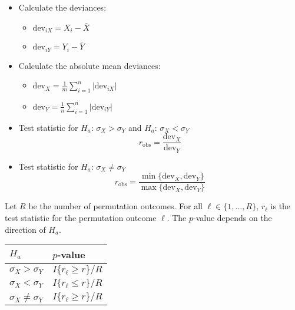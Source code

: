 \documentclass[
]{book}
\providecommand{\tightlist}{%
  \setlength{\itemsep}{0pt}\setlength{\parskip}{0pt}}
\begin{document}
\begin{itemize}
\tightlist
\item
  Calculate the deviances:

  \begin{itemize}
  \tightlist
  \item
    \(\mathrm{dev}_{iX} = X_i - \bar{X}\)
  \item
    \(\mathrm{dev}_{iY} = Y_i - \bar{Y}\)
  \end{itemize}
\item
  Calculate the absolute mean deviances:

  \begin{itemize}
  \tightlist
  \item
    \(\mathrm{dev}_X = \frac{1}{m} \sum_{i=1}^n |\mathrm{dev}_{iX}|\)
  \item
    \(\mathrm{dev}_Y = \frac{1}{n} \sum_{i=1}^n |\mathrm{dev}_{iY}|\)
  \end{itemize}
\item
  Test statistic for \(H_a\): \(\sigma_X > \sigma_Y\)
  and \(H_a\): \(\sigma_X < \sigma_Y\)
  \[r_{\mathrm{obs}} = \frac{\mathrm{dev}_X}{\mathrm{dev}_Y}\]
\item
  Test statistic for \(H_a\): \(\sigma_X \neq \sigma_Y\)
  \[r_{\mathrm{obs}} = \frac{\min \{\mathrm{dev}_X, \mathrm{dev}_Y\}}
             {\max \{\mathrm{dev}_X, \mathrm{dev}_Y\}}\]
\end{itemize}

Let \(R\) be the number of permutation outcomes.
For all \(\ell \in \{1, \dots, R\}\),
\(r_\ell\) is the test statistic for the permutation outcome \(\ell\).
The \(p\)-value depends on the direction of \(H_a\).

\begin{longtable}[]{@{}ll@{}}
\toprule
\(H_a\) & \(p\)-value\tabularnewline
\midrule
\endhead
\(\sigma_X > \sigma_Y\) & \(I\{r_\ell \geq r\} / R\)\tabularnewline
\(\sigma_X < \sigma_Y\) & \(I\{r_\ell \leq r\} / R\)\tabularnewline
\(\sigma_X \neq \sigma_Y\) & \(I\{r_\ell \geq r\} / R\)\tabularnewline
\bottomrule
\end{longtable}
\end{document}
